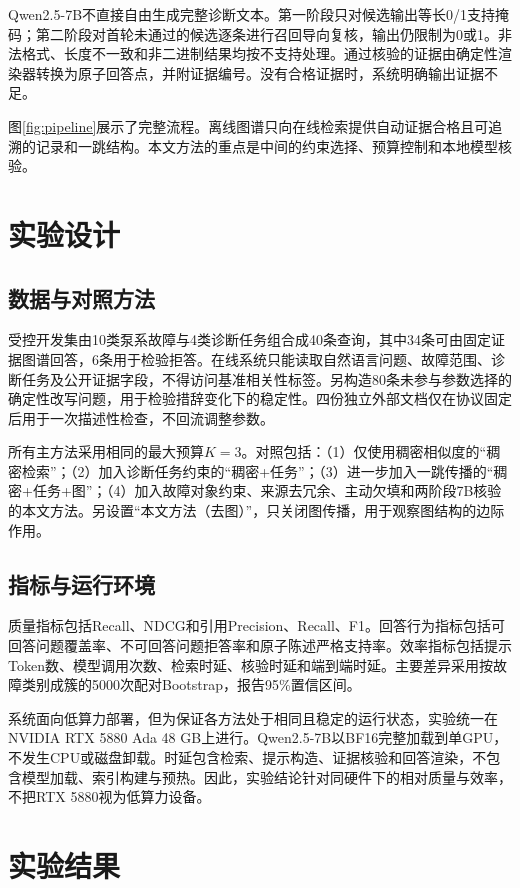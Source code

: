 \documentclass[conference]{IEEEtran}
\begin{document}
Qwen2.5-7B不直接自由生成完整诊断文本。第一阶段只对候选输出等长0/1支持掩码；第二阶段对首轮未通过的候选逐条进行召回导向复核，输出仍限制为0或1。非法格式、长度不一致和非二进制结果均按不支持处理。通过核验的证据由确定性渲染器转换为原子回答点，并附证据编号。没有合格证据时，系统明确输出证据不足。

图\ref{fig:pipeline}展示了完整流程。离线图谱只向在线检索提供自动证据合格且可追溯的记录和一跳结构。本文方法的重点是中间的约束选择、预算控制和本地模型核验。

\section{实验设计}

\subsection{数据与对照方法}

受控开发集由10类泵系故障与4类诊断任务组合成40条查询，其中34条可由固定证据图谱回答，6条用于检验拒答。在线系统只能读取自然语言问题、故障范围、诊断任务及公开证据字段，不得访问基准相关性标签。另构造80条未参与参数选择的确定性改写问题，用于检验措辞变化下的稳定性。四份独立外部文档仅在协议固定后用于一次描述性检查，不回流调整参数。

所有主方法采用相同的最大预算$K=3$。对照包括：（1）仅使用稠密相似度的“稠密检索”；（2）加入诊断任务约束的“稠密+任务”；（3）进一步加入一跳传播的“稠密+任务+图”；（4）加入故障对象约束、来源去冗余、主动欠填和两阶段7B核验的本文方法。另设置“本文方法（去图）”，只关闭图传播，用于观察图结构的边际作用。

\subsection{指标与运行环境}

质量指标包括Recall、NDCG和引用Precision、Recall、F1。回答行为指标包括可回答问题覆盖率、不可回答问题拒答率和原子陈述严格支持率。效率指标包括提示Token数、模型调用次数、检索时延、核验时延和端到端时延。主要差异采用按故障类别成簇的5000次配对Bootstrap，报告95\%置信区间。

系统面向低算力部署，但为保证各方法处于相同且稳定的运行状态，实验统一在NVIDIA RTX 5880 Ada 48 GB上进行。Qwen2.5-7B以BF16完整加载到单GPU，不发生CPU或磁盘卸载。时延包含检索、提示构造、证据核验和回答渲染，不包含模型加载、索引构建与预热。因此，实验结论针对同硬件下的相对质量与效率，不把RTX 5880视为低算力设备。

\section{实验结果}
\end{document}
